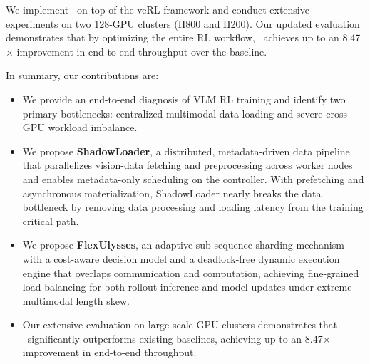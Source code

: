 We implement \SysName~on top of the veRL framework and conduct extensive experiments on two 128-GPU clusters (H800 and H200). Our updated evaluation demonstrates that by optimizing the entire RL workflow, \SysName~achieves up to an 8.47$\times$ improvement in end-to-end throughput over the baseline. 

In summary, our contributions are:
\begin{itemize}
    \item We provide an end-to-end diagnosis of VLM RL training and identify two primary bottlenecks: centralized multimodal data loading and severe cross-GPU workload imbalance.
    \item We propose \textbf{ShadowLoader}, a distributed, metadata-driven data pipeline that parallelizes vision-data fetching and preprocessing across worker nodes and enables metadata-only scheduling on the controller. With prefetching and asynchronous materialization, ShadowLoader nearly breaks the data bottleneck by removing data processing and loading latency from the training critical path.
    \item We propose \textbf{FlexUlysses}, an adaptive sub-sequence sharding mechanism with a cost-aware decision model and a deadlock-free dynamic execution engine that overlaps communication and computation, achieving fine-grained load balancing for both rollout inference and model updates under extreme multimodal length skew.
    \item Our extensive evaluation on large-scale GPU clusters demonstrates that \SysName~significantly outperforms existing baselines, achieving up to an 8.47$\times$ improvement in end-to-end throughput.
\end{itemize}
